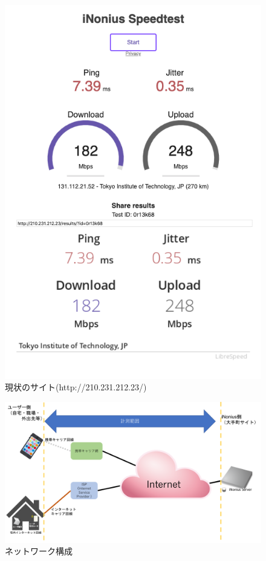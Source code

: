 \documentclass[rinkou,a4paper]{ieicej}
\begin{document}
\begin{figure}[hh]
\centering
\includegraphics[scale = 0.4]{Screenshot.png}
\caption{現状のサイト(http://210.231.212.23/)}\label{ss}
\end{figure}

\begin{figure}[ht]
\centering
\includegraphics[scale = 0.25]{structure.png}
\caption{ネットワーク構成}\label{struct}
\end{figure}
\end{document}
